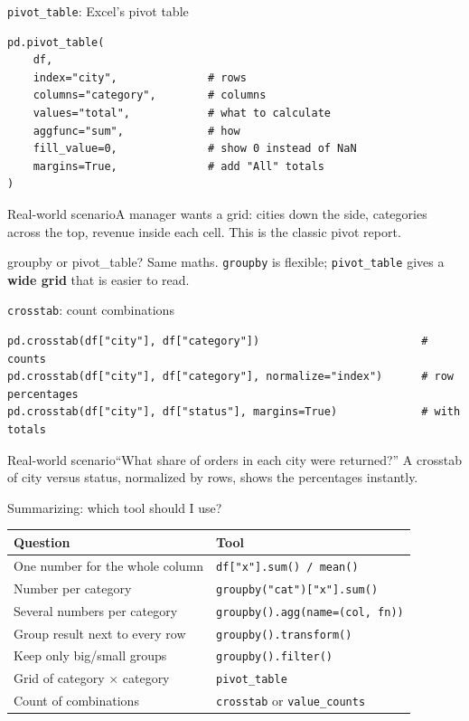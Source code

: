 \documentclass[aspectratio=169,10pt]{beamer}
\newcommand{\code}[1]{\texttt{#1}}
\newcommand{\scenario}[1]{\begin{exampleblock}{Real-world scenario}#1\end{exampleblock}}
\begin{document}
\begin{frame}[fragile]{\texttt{pivot\_table}: Excel's pivot table}
\begin{lstlisting}
pd.pivot_table(
    df,
    index="city",              # rows
    columns="category",        # columns
    values="total",            # what to calculate
    aggfunc="sum",             # how
    fill_value=0,              # show 0 instead of NaN
    margins=True,              # add "All" totals
)
\end{lstlisting}
  \scenario{A manager wants a grid: cities down the side, categories across the top, revenue
  inside each cell. This is the classic pivot report.}
  \begin{block}{groupby or pivot\_table?}
    Same maths. \code{groupby} is flexible; \code{pivot\_table} gives a \textbf{wide grid}
    that is easier to read.
  \end{block}
\end{frame}

\begin{frame}[fragile]{\texttt{crosstab}: count combinations}
\begin{lstlisting}
pd.crosstab(df["city"], df["category"])                         # counts
pd.crosstab(df["city"], df["category"], normalize="index")      # row percentages
pd.crosstab(df["city"], df["status"], margins=True)             # with totals
\end{lstlisting}
  \scenario{``What share of orders in each city were returned?'' A crosstab of city versus
  status, normalized by rows, shows the percentages instantly.}
\end{frame}

\begin{frame}{Summarizing: which tool should I use?}
  \small
  \renewcommand{\arraystretch}{1.25}
  \begin{center}
  \begin{tabular}{p{5.5cm}p{5.5cm}}
    \toprule
    \textbf{Question} & \textbf{Tool}\\
    \midrule
    One number for the whole column & \code{df["x"].sum() / mean()}\\
    Number per category & \code{groupby("cat")["x"].sum()}\\
    Several numbers per category & \code{groupby().agg(name=(col, fn))}\\
    Group result next to every row & \code{groupby().transform()}\\
    Keep only big/small groups & \code{groupby().filter()}\\
    Grid of category $\times$ category & \code{pivot\_table}\\
    Count of combinations & \code{crosstab} or \code{value\_counts}\\
    \bottomrule
  \end{tabular}
  \end{center}
\end{frame}
\end{document}

